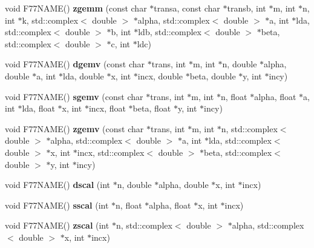 \begin{DoxyCompactItemize}
\item 
void F77\-N\-A\-M\-E() {\bfseries zgemm} (const char $\ast$transa, const char $\ast$transb, int $\ast$m, int $\ast$n, int $\ast$k, std\-::complex$<$ double $>$ $\ast$alpha, std\-::complex$<$ double $>$ $\ast$a, int $\ast$lda, std\-::complex$<$ double $>$ $\ast$b, int $\ast$ldb, std\-::complex$<$ double $>$ $\ast$beta, std\-::complex$<$ double $>$ $\ast$c, int $\ast$ldc)\label{blas__stuff_8h_a2f47dca573db1da2d540cfa438c8be69}

\item 
void F77\-N\-A\-M\-E() {\bfseries dgemv} (const char $\ast$trans, int $\ast$m, int $\ast$n, double $\ast$alpha, double $\ast$a, int $\ast$lda, double $\ast$x, int $\ast$incx, double $\ast$beta, double $\ast$y, int $\ast$incy)\label{blas__stuff_8h_ab52e24d0727149333366414cd33821a3}

\item 
void F77\-N\-A\-M\-E() {\bfseries sgemv} (const char $\ast$trans, int $\ast$m, int $\ast$n, float $\ast$alpha, float $\ast$a, int $\ast$lda, float $\ast$x, int $\ast$incx, float $\ast$beta, float $\ast$y, int $\ast$incy)\label{blas__stuff_8h_a78ad03a21ef7454cd6c4ea40c1169235}

\item 
void F77\-N\-A\-M\-E() {\bfseries zgemv} (const char $\ast$trans, int $\ast$m, int $\ast$n, std\-::complex$<$ double $>$ $\ast$alpha, std\-::complex$<$ double $>$ $\ast$a, int $\ast$lda, std\-::complex$<$ double $>$ $\ast$x, int $\ast$incx, std\-::complex$<$ double $>$ $\ast$beta, std\-::complex$<$ double $>$ $\ast$y, int $\ast$incy)\label{blas__stuff_8h_a030c8e4ccfdc3267d04dd47d5d66eeb0}

\item 
void F77\-N\-A\-M\-E() {\bfseries dscal} (int $\ast$n, double $\ast$alpha, double $\ast$x, int $\ast$incx)\label{blas__stuff_8h_a5940e4bbace078a3cb76d96647f1f213}

\item 
void F77\-N\-A\-M\-E() {\bfseries sscal} (int $\ast$n, float $\ast$alpha, float $\ast$x, int $\ast$incx)\label{blas__stuff_8h_aee69fd7524cc39972bc9b3d902e38823}

\item 
void F77\-N\-A\-M\-E() {\bfseries zscal} (int $\ast$n, std\-::complex$<$ double $>$ $\ast$alpha, std\-::complex$<$ double $>$ $\ast$x, int $\ast$incx)\label{blas__stuff_8h_a9c69f424b9c6054552f2123afa19aa37}

\end{DoxyCompactItemize}


